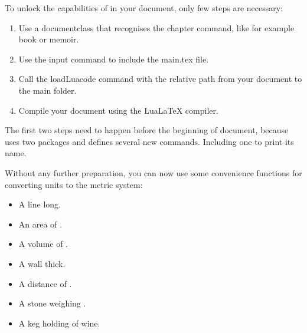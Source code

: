 \documentclass{book}
\begin{document}
To unlock the capabilities of \RpgTex{} in your document, only few steps are necessary:
\begin{enumerate}
\item Use a documentclass that recognises the chapter command, like for example book or memoir.
\item Use the input command to include the main.tex file.
\item Call the loadLuacode command with the relative path from your document to the main folder.
\item Compile your document using the Lua\LaTeX{} compiler.
\end{enumerate}

The first two steps need to happen before the beginning of document, because \RpgTex{} uses two packages and defines several new commands. Including one to print its name.

Without any further preparation, you can now use some convenience functions for converting units to the metric system:
\begin{itemize}
\item A line  long.
\item An area of .
\item A volume of .
\item A wall  thick.
\item A distance of .
\item A stone weighing .
\item A keg holding  of wine.
\end{itemize}
\end{document}
